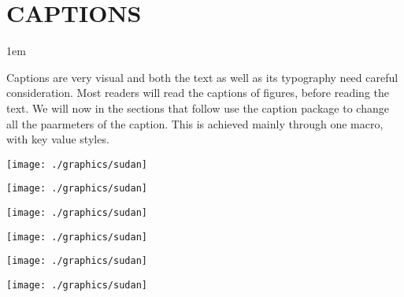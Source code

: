 \chapter{CAPTIONS}
\parindent1em
\begin{multicols}{2}

Captions are very visual and both the text as well as its typography need careful consideration. Most readers will read the captions of figures, before reading the text. We will now in the sections that follow use the caption package to change all the paarmeters of the caption. This is achieved mainly through one macro, with key value styles.

\end{multicols}
\long{}
\begin{center}
\begin{minipage}[t]{72pt}
\captionsetup{figurename=Figure, labelsep=none}
 \texttt{[image: ./graphics/sudan]}
\end{minipage}
\begin{minipage}[t]{72pt}
\captionsetup{figurename=Figure, labelsep=colon}
 \texttt{[image: ./graphics/sudan]}
\end{minipage}
\begin{minipage}[t]{72pt}
\captionsetup{figurename=Figure, labelsep=period}
 \texttt{[image: ./graphics/sudan]}
\end{minipage}

\begin{minipage}[t]{72pt}
     \captionsetup{figurename=Figure, labelsep=quad}
     \texttt{[image: ./graphics/sudan]}
\end{minipage}
\begin{minipage}[t]{72pt}
\captionsetup{figurename=Figure, labelsep=newline}
 \texttt{[image: ./graphics/sudan]}
\end{minipage}
\begin{minipage}[t]{72pt}
\captionsetup{figurename=Figure, labelsep=endash}
 \texttt{[image: ./graphics/sudan]}
\end{minipage}
\end{center}


%

